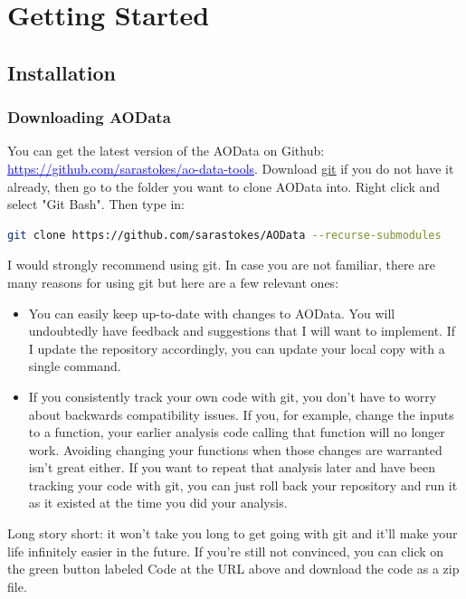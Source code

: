 \documentclass[10pt]{exam}
\newcommand\myurl[1]{\textcolor{blue}{\underline{#1}}}
\begin{document}
\section{Getting Started}
	\subsection{Installation}
        \subsubsection{Downloading AOData}
		\noindent You can get the latest version of the AOData on Github: \myurl{https://github.com/sarastokes/ao-data-tools}. Download \myurl{\href{https://git-scm.com/}{git}} if you do not have it already, then go to the folder you want to clone AOData into. Right click and select "Git Bash". Then type in:
		\begin{lstlisting}[language=bash]
git clone https://github.com/sarastokes/AOData --recurse-submodules
		\end{lstlisting}
		
		\noindent I would strongly recommend using git. In case you are not familiar, there are many reasons for using git but here are a few relevant ones:
		\begin{itemize}
			\item You can easily keep up-to-date with changes to AOData. You will undoubtedly have feedback and suggestions that I will want to implement. If I update the repository accordingly, you can update your local copy with a single command.
			\item If you consistently track your own code with git, you don't have to worry about backwards compatibility issues. If you, for example, change the inputs to a function, your earlier analysis code calling that function will no longer work. Avoiding changing your functions when those changes are warranted isn't great either. If you want to repeat that analysis later and have been tracking your code with git, you can just roll back your repository and run it as it existed at the time you did your analysis. 
		\end{itemize}
		Long story short: it won't take you long to get going with git and it'll make your life infinitely easier in the future. 
		If you're still not convinced, you can click on the green button labeled Code at the URL above and download the code as a zip file. 
\end{document}
